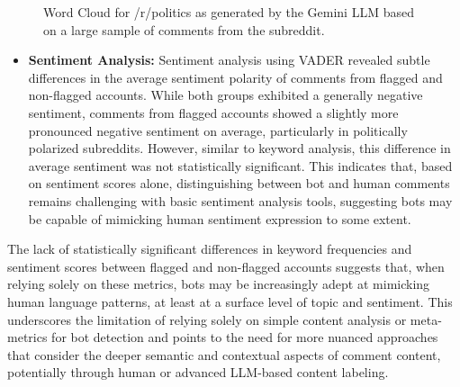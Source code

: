 \documentclass[
  12pt,
  letterpaper,
  DIV=11,
  numbers=noendperiod]{scrartcl}
\providecommand{\tightlist}{%
  \setlength{\itemsep}{0pt}\setlength{\parskip}{0pt}}\usepackage{longtable,booktabs,array}
\begin{document}
\begin{figure}


\caption{\label{fig-polwc}Word Cloud for /r/politics as generated by the
Gemini LLM based on a large sample of comments from the subreddit.}

\end{figure}%

\begin{itemize}
\tightlist
\item
  \textbf{Sentiment Analysis:} Sentiment analysis using VADER revealed
  subtle differences in the average sentiment polarity of comments from
  flagged and non-flagged accounts. While both groups exhibited a
  generally negative sentiment, comments from flagged accounts showed a
  slightly more pronounced negative sentiment on average, particularly
  in politically polarized subreddits. However, similar to keyword
  analysis, this difference in average sentiment was not statistically
  significant. This indicates that, based on sentiment scores alone,
  distinguishing between bot and human comments remains challenging with
  basic sentiment analysis tools, suggesting bots may be capable of
  mimicking human sentiment expression to some extent.
\end{itemize}

The lack of statistically significant differences in keyword frequencies
and sentiment scores between flagged and non-flagged accounts suggests
that, when relying solely on these metrics, bots may be increasingly
adept at mimicking human language patterns, at least at a surface level
of topic and sentiment. This underscores the limitation of relying
solely on simple content analysis or meta-metrics for bot detection and
points to the need for more nuanced approaches that consider the deeper
semantic and contextual aspects of comment content, potentially through
human or advanced LLM-based content labeling.
\end{document}
